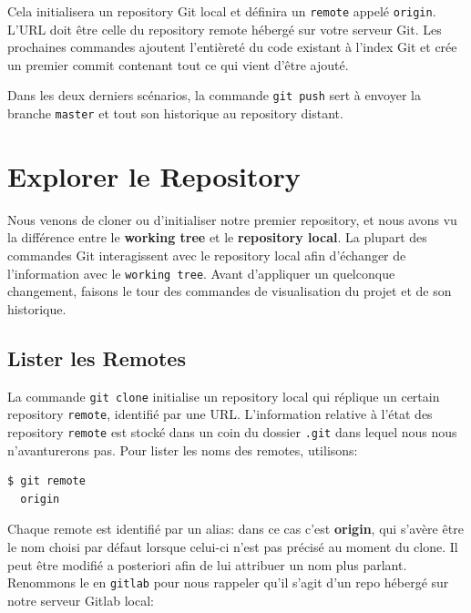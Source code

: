 \documentclass{../../common/tufte-latex/tufte-handout}
\begin{document}
Cela initialisera un repository Git local et définira un \texttt{remote} appelé \texttt{origin}. L'URL doit être celle du repository remote hébergé sur votre serveur Git. Les prochaines commandes ajoutent l'entièreté du code existant à l'index Git et crée un premier commit contenant tout ce qui vient d'être ajouté.

Dans  les deux derniers scénarios, la commande \texttt{git push} sert à envoyer la branche \texttt{master} et tout son historique au repository distant.

\section{Explorer le Repository}

Nous venons de cloner ou d'initialiser notre premier repository, et nous avons vu la différence entre le \textbf{working tree} et le \textbf{repository local}.
La plupart des commandes Git interagissent avec le repository local afin d'échanger de l'information avec le \texttt{working tree}.
Avant d'appliquer un quelconque changement, faisons le tour des commandes de visualisation du projet et de son historique.

\subsection{Lister les Remotes}

La commande \texttt{git clone} initialise un repository local qui réplique un certain repository \texttt{remote}, identifié par une URL.
L'information relative à l'état des repository \texttt{remote} est stocké dans un coin du dossier \texttt{.git} dans lequel nous nous n'avanturerons pas.
Pour lister les noms des remotes, utilisons:

\begin{lstlisting}[style=BashInputStyle]
  $ git remote
  origin
\end{lstlisting}

Chaque remote est identifié par un alias: dans ce cas c'est \textbf{origin}, qui s'avère être le nom choisi par défaut lorsque celui-ci n'est pas précisé au moment du clone.
Il peut être modifié a posteriori afin de lui attribuer un nom plus parlant.
Renommons le en \texttt{gitlab} pour nous rappeler qu'il s'agit d'un repo hébergé sur notre serveur Gitlab local:
\end{document}
